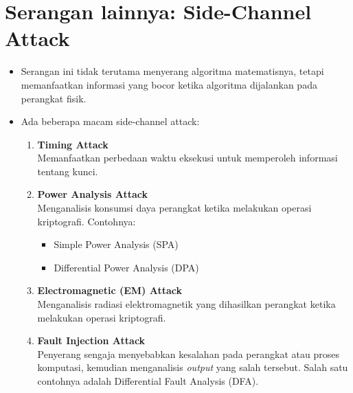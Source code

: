 \documentclass{article}
\begin{document}

\section*{Serangan lainnya: Side-Channel Attack}

\begin{itemize}
    \item Serangan ini tidak terutama menyerang algoritma matematisnya, tetapi memanfaatkan informasi yang bocor ketika algoritma dijalankan pada perangkat fisik.
    \item Ada beberapa macam side-channel attack:
    \begin{enumerate}
        \item \textbf{Timing Attack} \\ Memanfaatkan perbedaan waktu eksekusi untuk memperoleh informasi tentang kunci.
        \item \textbf{Power Analysis Attack} \\ Menganalisis konsumsi daya perangkat ketika melakukan operasi kriptografi. Contohnya:
        \begin{itemize}
            \item Simple Power Analysis (SPA)
            \item Differential Power Analysis (DPA)
        \end{itemize}
        \item \textbf{Electromagnetic (EM) Attack} \\ Menganalisis radiasi elektromagnetik yang dihasilkan perangkat ketika melakukan operasi kriptografi.
        \item \textbf{Fault Injection Attack} \\ Penyerang sengaja menyebabkan kesalahan pada perangkat atau proses komputasi, kemudian menganalisis \textit{output} yang salah tersebut. Salah satu contohnya adalah Differential Fault Analysis (DFA).
    \end{enumerate}
\end{itemize}
\end{document}
